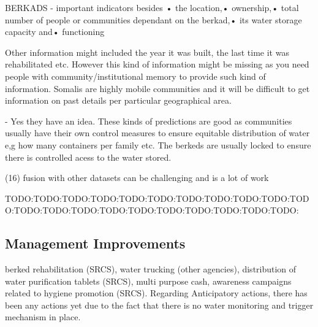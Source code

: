 BERKADS - important indicators besides •	the location,•	ownership,•	total number of people or communities dependant on the berkad,•	its water storage capacity and•	functioning

Other information might included the year it was built, the last time it was rehabilitated etc. However this kind of information might be missing as you need people with community/institutional memory to provide such kind of information. Somalis are highly mobile communities and it will be difficult to get information on past details per particular geographical area.


-	Yes they have an idea. These kinds of predictions are good as communities usually have their own control measures to ensure equitable distribution of water e,g how many containers per family etc. The berkeds are usually locked to ensure there is controlled acess to the water stored.






(16) fusion with other datasets can be challenging and is a lot of work










TODO:TODO:TODO:TODO:TODO:TODO:TODO:TODO:TODO:TODO:TODO:TODO:TODO:TODO:TODO:TODO:TODO:TODO:TODO:TODO:TODO:
\subsection{Management Improvements}



berked rehabilitation (SRCS), water trucking (other agencies), distribution of water purification tablets (SRCS), multi purpose cash, awareness campaigns related to hygiene promotion (SRCS). Regarding Anticipatory actions, there has been any actions yet due to the fact that there is no water monitoring and trigger mechanism in place.

